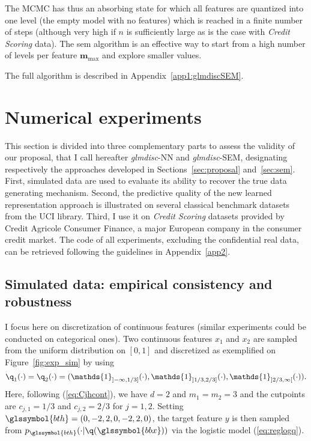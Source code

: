 The MCMC has thus an absorbing state for which all features are quantized into one level (the empty model with no features) which is reached in a finite number of steps (although very high if $n$ is sufficiently large as is the case with \textit{Credit Scoring} data). The \gls{sem} algorithm is an effective way to start from a high number of levels per feature $\bm{m}_{\max}$ and explore smaller values.

The full algorithm is described in Appendix~\ref{app1:glmdiscSEM}.

\section{Numerical experiments} \label{sec:experiments}

This section is divided into three complementary parts to assess the validity of our proposal, that I call hereafter \textit{glmdisc}-NN and \textit{glmdisc}-SEM, designating respectively the approaches developed in Sections~\ref{sec:proposal} and~\ref{sec:sem}. First, simulated data are used to evaluate its ability to recover the true data generating mechanism. Second, the predictive quality of the new learned representation approach is illustrated on several classical benchmark datasets from the UCI library. Third, I use it on \textit{Credit Scoring} datasets provided by Credit Agricole Consumer Finance, a major European company in the consumer credit market. The code of all experiments, excluding the confidential real data, can be retrieved following the guidelines in Appendix~\ref{app2}.


\subsection{Simulated data: empirical consistency and robustness}

I focus here on discretization of continuous features (similar experiments could be conducted on categorical ones). Two continuous features $x_1$ and $x_2$ are sampled from the uniform distribution on $[0,1]$ and discretized as exemplified on Figure~\ref{fig:exp_sim} by using
\[\q_1(\cdot)=\q_2(\cdot) = (\mathds{1}_{]-\infty,1/3]}(\cdot),\mathds{1}_{]1/3,2/3]}(\cdot),\mathds{1}_{]2/3,\infty[}(\cdot)).\]
Here, following (\ref{eq:Cjhcont}), we have $d=2$ and $m_1=m_2=3$ and the cutpoints are $c_{j,1}=1/3$ and $c_{j,2}=2/3$ for $j=1,2$. Setting $\glssymbol{bth}=(0,-2,2,0,-2,2,0)$, the target feature $y$ is then sampled from $p_{\glssymbol{bth}}(\cdot | \q(\glssymbol{bbx}))$ via the logistic model (\ref{eq:reglogq}).

